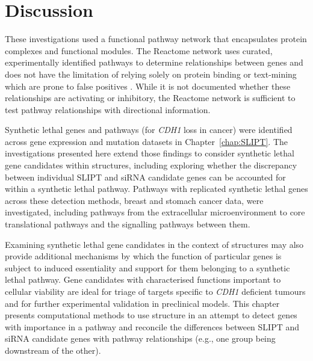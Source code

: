 \FloatBarrier

\section{Discussion}

These investigations used a functional \gls{pathway} network that encapsulates protein complexes and functional modules. The Reactome network uses curated, experimentally identified \glspl{pathway} to determine relationships between genes and does not have the limitation of relying solely on protein binding or text-mining which are prone to false positives \citep{Reactome} . While it is not documented whether these relationships are activating or inhibitory, the Reactome network \citep{Reactome} is sufficient to test \gls{pathway} relationships with directional information.

Synthetic lethal genes and \glspl{pathway} (for \textit{CDH1} loss in cancer) were identified across \gls{gene expression} and \gls{mutation} datasets in Chapter~\ref{chap:SLIPT}.
The investigations presented here extend those findings to consider \gls{synthetic lethal} gene candidates within  structures, including exploring whether the discrepancy between individual \gls{SLIPT} and \gls{siRNA} candidate genes can be accounted for within a \gls{synthetic lethal} \gls{pathway}.
%
Pathways with replicated \gls{synthetic lethal} genes across these detection methods, breast and stomach cancer data, were investigated, including \glspl{pathway} from the extracellular microenvironment to core translational \glspl{pathway} and the signalling \glspl{pathway} between them.

Examining \gls{synthetic lethal} gene candidates in the context of  structures may also provide additional mechanisms by which the function of particular genes is subject to \gls{induced essentiality} and support for them belonging to a \gls{synthetic lethal} \gls{pathway}. Gene candidates with characterised functions important to cellular viability are ideal for triage of targets specific to \textit{CDH1} deficient tumours and for further experimental validation in preclinical models.
This chapter presents computational methods to use  structure in an attempt to detect genes with importance in a \gls{pathway} and reconcile the differences between \gls{SLIPT} and \gls{siRNA} candidate genes with \gls{pathway} relationships (e.g., one group being downstream of the other).

